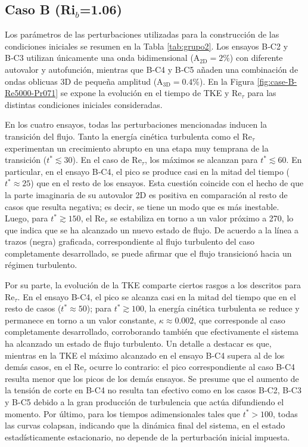 \subsection{Caso B (Ri$_b$=1.06)}

Los parámetros de las perturbaciones utilizadas para la construcción de las condiciones iniciales se resumen en la Tabla \ref{tab:grupo2}. Los ensayos B‑C2 y B‑C3 utilizan únicamente una onda bidimensional ($\text{A}_{\text{2D}}=2 \%$) con diferente autovalor y autofunción, mientras que B‑C4 y B‑C5 añaden una combinación de ondas oblicuas 3D de pequeña amplitud ($\text{A}_{\text{3D}}= 0\text{.}4\%$). En la Figura \ref{fig:case-B-Re5000-Pr071} se expone la evolución en el tiempo de TKE y Re$_{\tau}$ para las distintas condiciones iniciales consideradas.  

En los cuatro ensayos, todas las perturbaciones mencionadas inducen la transición del flujo. Tanto la energía cinética turbulenta como el Re$_{\tau}$ experimentan un crecimiento abrupto en una etapa muy temprana de la transición ($t^*\lesssim 30$). En el caso de Re$_{\tau}$, los máximos se alcanzan para $t^*\lesssim 60$. En particular, en el ensayo B‑C4, el pico se produce casi en la mitad del tiempo ($t^*\approx 25$) que en el resto de los ensayos. Esta cuestión coincide con el hecho de que la parte imaginaria de su autovalor 2D es positiva en comparación al resto de casos que resulta negativa; es decir, se tiene un modo que es más inestable. Luego, para $t^* \gtrsim 150$, el Re$_{\tau}$ se estabiliza en torno a un valor próximo a 270, lo que indica que se ha alcanzado un nuevo estado de flujo. De acuerdo a la línea a trazos (negra) graficada, correspondiente al flujo turbulento del caso completamente desarrollado, se puede afirmar que el flujo transicionó hacia un régimen turbulento.  

Por su parte, la evolución de la TKE comparte ciertos rasgos a los descritos para Re$_{\tau}$. En el ensayo B-C4, el pico se alcanza casi en la mitad del tiempo que en el resto de casos ($t^*\approx 50$); para $t^* \gtrsim 100$, la energía cinética turbulenta se reduce y permanece en torno a un valor constante, $\kappa \approx 0\text{.}002$, que corresponde al caso completamente desarrollado, corroborando también que efectivamente el sistema ha alcanzado un estado de flujo turbulento. Un detalle a destacar es que, mientras en la TKE el máximo alcanzado en el ensayo B-C4 supera al de los demás casos, en el Re$_{\tau}$ ocurre lo contrario: el pico correspondiente al caso B-C4 resulta menor que los picos de los demás ensayos. Se presume que el aumento de la tensión de corte en B-C4 no resulta tan efectivo como en los casos B-C2, B-C3 y B-C5 debido a la gran producción de turbulencia que actúa difundiendo el momento. Por último, para los tiempos adimensionales tales que $t^* > 100$, todas las curvas colapsan, indicando que la dinámica final del sistema, en el estado estadísticamente estacionario, no depende de la perturbación inicial impuesta. 


